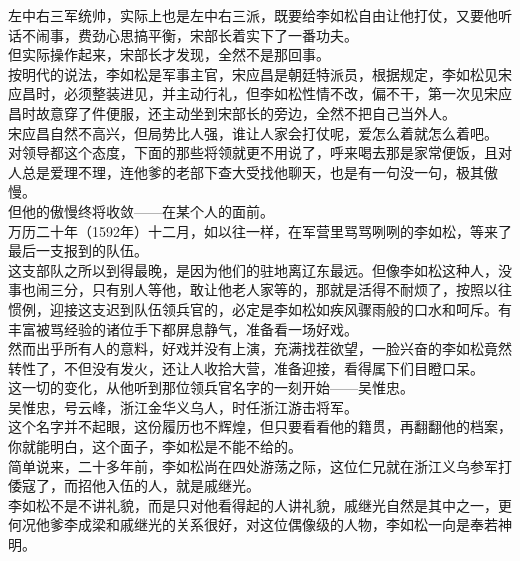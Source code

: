 \begin{multicols}{\theparacolNo}
左中右三军统帅，实际上也是左中右三派，既要给李如松自由让他打仗，又要他听话不闹事，费劲心思搞平衡，宋部长着实下了一番功夫。\\

但实际操作起来，宋部长才发现，全然不是那回事。\\

按明代的说法，李如松是军事主官，宋应昌是朝廷特派员，根据规定，李如松见宋应昌时，必须整装进见，并主动行礼，但李如松性情不改，偏不干，第一次见宋应昌时故意穿了件便服，还主动坐到宋部长的旁边，全然不把自己当外人。\\

宋应昌自然不高兴，但局势比人强，谁让人家会打仗呢，爱怎么着就怎么着吧。\\

对领导都这个态度，下面的那些将领就更不用说了，呼来喝去那是家常便饭，且对人总是爱理不理，连他爹的老部下查大受找他聊天，也是有一句没一句，极其傲慢。\\

但他的傲慢终将收敛——在某个人的面前。\\

万历二十年（1592年）十二月，如以往一样，在军营里骂骂咧咧的李如松，等来了最后一支报到的队伍。\\

这支部队之所以到得最晚，是因为他们的驻地离辽东最远。但像李如松这种人，没事也闹三分，只有别人等他，敢让他老人家等的，那就是活得不耐烦了，按照以往惯例，迎接这支迟到队伍领兵官的，必定是李如松如疾风骤雨般的口水和呵斥。有丰富被骂经验的诸位手下都屏息静气，准备看一场好戏。\\

然而出乎所有人的意料，好戏并没有上演，充满找茬欲望，一脸兴奋的李如松竟然转性了，不但没有发火，还让人收拾大营，准备迎接，看得属下们目瞪口呆。\\

这一切的变化，从他听到那位领兵官名字的一刻开始——吴惟忠。\\

吴惟忠，号云峰，浙江金华义乌人，时任浙江游击将军。\\

这个名字并不起眼，这份履历也不辉煌，但只要看看他的籍贯，再翻翻他的档案，你就能明白，这个面子，李如松是不能不给的。\\

简单说来，二十多年前，李如松尚在四处游荡之际，这位仁兄就在浙江义乌参军打倭寇了，而招他入伍的人，就是戚继光。\\

李如松不是不讲礼貌，而是只对他看得起的人讲礼貌，戚继光自然是其中之一，更何况他爹李成梁和戚继光的关系很好，对这位偶像级的人物，李如松一向是奉若神明。\\


\end{multicols}
